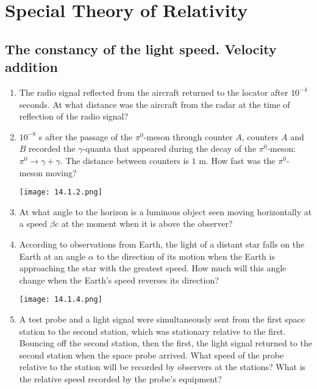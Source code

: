 \documentclass{article}
\begin{document}
\section{Special Theory of Relativity}

\subsection{The constancy of the light speed. Velocity addition}

\begin{enumerate}[label=14.1.\arabic*]

\item The radio signal reflected from the aircraft returned to the locator after $10^{-4}$ seconds. At what distance was the aircraft from the radar at the time of reflection of the radio signal?

\item $10^{-8}$ s after the passage of the $\pi^0$-meson through counter $A$, counters $A$ and $B$ recorded the $\gamma$-quanta that appeared during the decay of the $\pi^0$-meson: $\pi^0 \to \gamma + \gamma$. The distance between counters is $1$ m. How fast was the $\pi^0$-meson moving?

\begin{center}
    \texttt{[image: 14.1.2.png]}
\end{center}

\item At what angle to the horizon is a luminous object seen moving horizontally at a speed $\beta c$ at the moment when it is above the observer?

\item According to observations from Earth, the light of a distant star falls on the Earth at an angle $\alpha$ to the direction of its motion when the Earth is approaching the star with the greatest speed. How much will this angle change when the Earth's speed reverses its direction?

\begin{center}
    \texttt{[image: 14.1.4.png]}
\end{center}

\item A test probe and a light signal were simultaneously sent from the first space station to the second station, which was stationary relative to the first. Bouncing off the second station, then the first, the light signal returned to the second station when the space probe arrived. What speed of the probe relative to the station will be recorded by observers at the stations? What is the relative speed recorded by the probe's equipment?


\end{enumerate}
\end{document}
